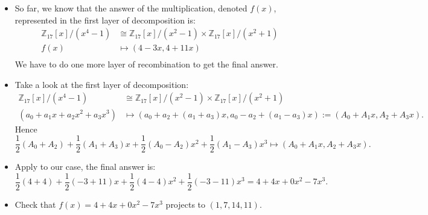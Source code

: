 \begin{frame}
    \begin{itemize}
        \item So far, we know that the answer of the multiplication, denoted \(f(x)\), 
            represented in the first layer of decomposition is:
            \begin{align*}
                \mathbb{Z}_{17}[x] / (x^{4} - 1) &\cong
                \mathbb{Z}_{17}[x] / (x^2-1) \times 
                \mathbb{Z}_{17}[x] / (x^2+1) \\
                f(x) &\mapsto (4 - 3x, 4 + 11x)\\
            \end{align*}
            We have to do one more layer of recombination to get the final answer.

        \item Take a look at the first layer of decomposition:
            \begin{align*}
                \mathbb{Z}_{17}[x] / (x^{4} - 1) &\cong
                \mathbb{Z}_{17}[x] / (x^2-1) \times
                \mathbb{Z}_{17}[x] / (x^2+1) \\
                (a_{0} + a_{1}x + a_{2}x^{2} + a_{3}x^{3}) &\mapsto
                (a_{0} + a_{2} + (a_{1} + a_{3})x, 
                a_{0} - a_{2} + (a_{1} - a_{3})x) := (A_{0} + A_{1}x, A_{2} + A_{3}x).
            \end{align*}
            Hence
            \[
                \frac{1}{2}(A_{0} + A_{2})  + 
                \frac{1}{2}(A_{1} + A_{3})x +
                \frac{1}{2}(A_{0} - A_{2})x^{2} +
                \frac{1}{2}(A_{1} - A_{3})x^{3} \mapsto
                (A_{0} + A_{1}x, A_{2} + A_{3}x).
            \]

        \item Apply to our case, the final answer is:
            \[
                \frac{1}{2}(4 + 4) + \frac{1}{2}(-3 + 11)x + 
                \frac{1}{2}(4 - 4)x^{2} + \frac{1}{2}(-3 - 11)x^{3} = 4 + 4x + 0x^{2} - 7x^{3}.
            \]
        \item Check that \(f(x) = 4 + 4x + 0x^{2} - 7x^{3}\) projects to \( (1, 7, 14, 11)\).
    \end{itemize}
\end{frame}

